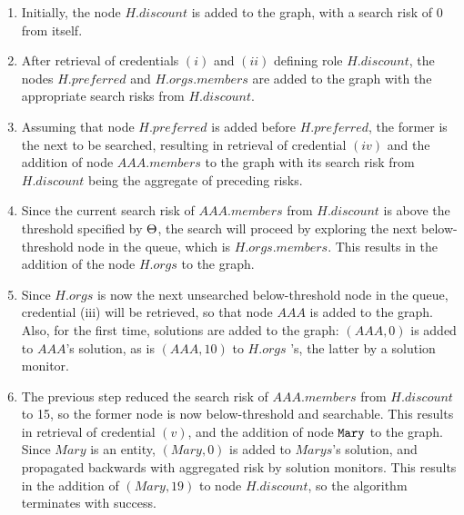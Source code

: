 \begin{enumerate}[\hspace{5pt}(a)]
\item Initially, the node $H.\mathit{discount}$ is added to the 
graph, with a search risk of 0 from itself.
\item After retrieval of credentials $(i)$ and $(ii)$ defining
role $H.\mathit{discount}$, the nodes $H.\mathit{preferred}$ and
$H.\mathit{orgs}.\mathit{members}$ are added to the graph with the
appropriate search risks from $H.\mathit{discount}$.
\item Assuming that node $H.\mathit{preferred}$ is added before
$H.\mathit{preferred}$, the former is the next to be searched,
resulting in retrieval of credential $(iv)$ and the addition of node
$\mathit{AAA}.\mathit{members}$ to the graph with its search risk from
$H.\mathit{discount}$ being the aggregate of preceding risks.
\item Since the current search risk of $\mathit{AAA}.\mathit{members}$
from $H.\mathit{discount}$ is above the threshold specified by 
$\Theta$, the search will proceed by exploring the next below-threshold
node in the queue, which is $H.\mathit{orgs}.\mathit{members}$.  
This results in the addition of the node  $H.\mathit{orgs}$ to 
the graph. 
\item Since $H.\mathit{orgs}$ is now the next unsearched
below-threshold node in the queue, credential (iii) will be retrieved,
so that node $\mathit{AAA}$ is added to the graph.  Also, for the
first time, solutions are added to the graph: $(\mathit{AAA},0)$ is 
added to $\mathit{AAA}$'s solution, as is $(\mathit{AAA},10)$ to
$H.\mathit{orgs}$ 's, the latter by a solution monitor.
\item The previous step reduced the search risk of
$\mathit{AAA}.\mathit{members}$ from $H.\mathit{discount}$ to 15, so
the former node is now below-threshold and searchable.  This results
in retrieval of credential $(v)$, and the addition of node
$\texttt{Mary}$ to the graph.  Since $\mathit{Mary}$ is an entity,
$(\mathit{Mary},0)$ is added to $\mathit{Marys}$'s solution, and
propagated backwards with aggregated risk by solution monitors.  This
results in the addition of $(\mathit{Mary},19)$ to node
$H.\mathit{discount}$, so the algorithm terminates with success.
\end{enumerate}


